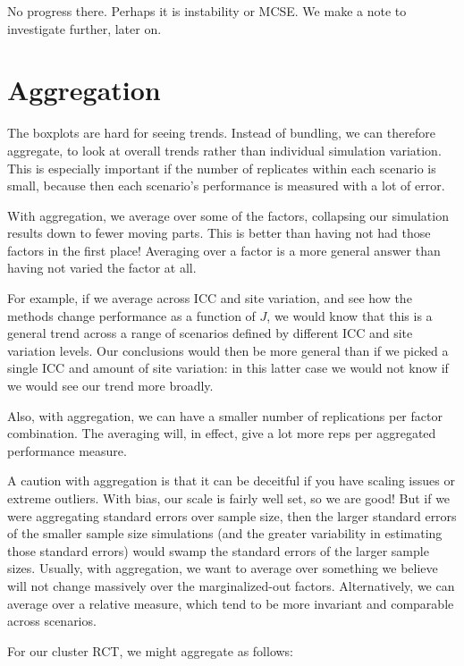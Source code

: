 \documentclass[
]{book}
\begin{document}
No progress there. Perhaps it is instability or MCSE.
We make a note to investigate further, later on.

\section{Aggregation}\label{aggregation}

The boxplots are hard for seeing trends.
Instead of bundling, we can therefore aggregate, to look at overall trends rather than individual simulation variation.
This is especially important if the number of replicates within each scenario is small, because then each scenario's performance is measured with a lot of error.

With aggregation, we average over some of the factors, collapsing our simulation results down to fewer moving parts.
This is better than having not had those factors in the first place!
Averaging over a factor is a more general answer than having not varied the factor at all.

For example, if we average across ICC and site variation, and see how the methods change performance as a function of \(J\), we would know that this is a general trend across a range of scenarios defined by different ICC and site variation levels.
Our conclusions would then be more general than if we picked a single ICC and amount of site variation: in this latter case we would not know if we would see our trend more broadly.

Also, with aggregation, we can have a smaller number of replications per factor combination.
The averaging will, in effect, give a lot more reps per aggregated performance measure.

A caution with aggregation is that it can be deceitful if you have scaling issues or extreme outliers.
With bias, our scale is fairly well set, so we are good!
But if we were aggregating standard errors over sample size, then the larger standard errors of the smaller sample size simulations (and the greater variability in estimating those standard errors) would swamp the standard errors of the larger sample sizes.
Usually, with aggregation, we want to average over something we believe will not change massively over the marginalized-out factors.
Alternatively, we can average over a relative measure, which tend to be more invariant and comparable across scenarios.

For our cluster RCT, we might aggregate as follows:
\end{document}
